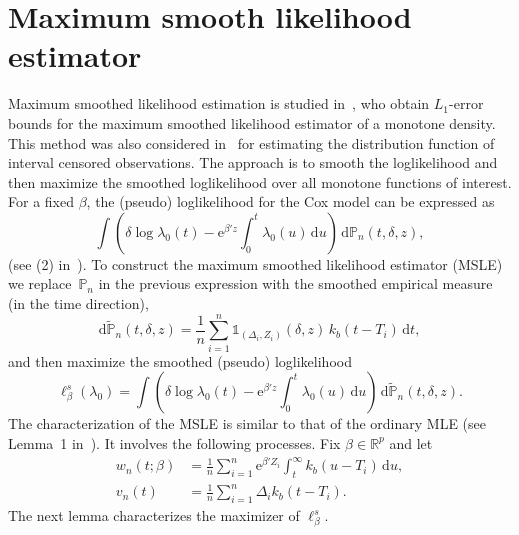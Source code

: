 \documentclass[11pt,reqno]{amsart}
\theoremstyle{definition}
\theoremstyle{plain}
\theoremstyle{remark}
\begin{document}
\section{Maximum smooth likelihood estimator}
\label{sec:MSLE}
Maximum smoothed likelihood estimation is studied in~\cite{eggermont-lariccia2000},
who obtain $L_1$-error bounds for the maximum smoothed likelihood estimator of a monotone density.
This method was also considered in~\cite{GJW10} for estimating the distribution function of interval censored observations.
The approach is to smooth the loglikelihood and then maximize the smoothed loglikelihood over all monotone functions of interest.
For a fixed $\beta$, the (pseudo) loglikelihood for the Cox model can be expressed as
\[
\int
\left(
\delta\log \lambda_0(t)-\mathrm{e}^{\beta'z}\int_0^t\lambda_0(u)\,\mathrm{d}u
\right)\,\mathrm{d}{\mathbb{P}}_n(t,\delta,z),
\]
(see (2) in~\cite{LopuhaaNane2013}).
To construct the maximum smoothed likelihood estimator (MSLE) we replace~${\mathbb{P}}_n$ in the previous expression with the smoothed empirical measure (in the time direction),
\[
\mathrm{d}\tilde{\mathbb{P}}_n(t,\delta,z)
=
\frac{1}{n}\sum_{i=1}^n {\mathds{1}}_{(\Delta_i,Z_i)}(\delta,z)\,k_b(t-T_i)\,\mathrm{d}t,
\]
and then maximize the smoothed (pseudo) loglikelihood
\begin{equation}
\label{def:smooth likelihood}
\ell^s_\beta(\lambda_0)
=
\int
\left(
\delta\log \lambda_0(t)-\mathrm{e}^{\beta'z}\int_0^t\lambda_0(u)\,\mathrm{d}u
\right)\,\mathrm{d}\tilde{\mathbb{P}}_n(t,\delta,z).
\end{equation}
The characterization of the MSLE is similar to that of the ordinary MLE
(see Lemma~1 in~\cite{LopuhaaNane2013}).
It involves the following processes.
Fix $\beta\in{\mathbb{R}}^p$ and let
\begin{equation}
\label{eqn:v_n w_n}
\begin{split}
w_n(t;\beta)
&=
\frac{1}{n}\sum_{i=1}^n
\mathrm{e}^{\beta'Z_i}\int_{t}^\infty k_b(u-T_i)\,\mathrm{d}u,\\
v_n(t)
&=
\frac{1}{n}
\sum_{i=1}^n \Delta_ik_b(t-T_i).
\end{split}
\end{equation}
The next lemma characterizes the maximizer of $\ell^s_\beta$.
\end{document}
